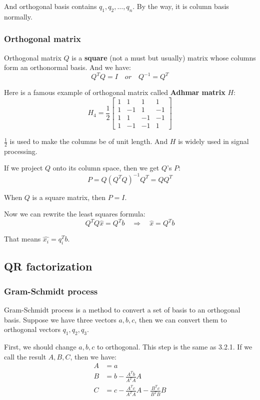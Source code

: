 \documentclass[12pt]{ctexart}
\begin{document}
And orthogonal basis contains $q_1, q_2, \ldots, q_n$. By the way, it is column basis
normally.

\subsubsection{\textbf{Orthogonal matrix}}

Orthogonal matrix $Q$ is a \textbf{square} (not a must but usually) matrix whose columns
form an orthonormal basis. And we have:
\[
  Q^{T}Q = I \quad or \quad Q^{-1} = Q^{T}
\]

Here is a famous example of orthogonal matrix called \textbf{Adhmar matrix} $H$:
\[
  H_4 = \frac12 \begin{bmatrix}
    1 & 1 & 1 & 1 \\
    1 & -1 & 1 & -1 \\
    1 & 1 & -1 & -1 \\
    1 & -1 & -1 & 1
  \end{bmatrix}
\]

$\frac12$ is used to make the columns be of unit length. And $H$ is widely used in
signal processing.

If we project $Q$ onto its column space, then we get $Q$'s $P$:
\[
  P = Q(Q^{T}Q)^{-1}Q^{T} = QQ^{T}
\]

When $Q$ is a square matrix, then $P = I$.

Now we can rewrite the least squares formula:
\[
  Q^{T}Q\hat{x} = Q^{T}b \quad \Rightarrow \quad \hat{x} = Q^{T}b
\]

That means $\hat{x_i} = $$q_i^{T}b$.

\subsection{\textbf{QR factorization}}
\subsubsection{\textbf{Gram-Schmidt process}}

Gram-Schmidt process is a method to convert a set of basis to an orthogonal basis. Suppose
we have three vectors $a, b, c$, then we can convert them to orthogonal vectors $q_1, q_2,
q_3$.

First, we should change $a, b, c$ to orthogonal. This step is the same as 3.2.1. If we
call the result $A, B, C$, then we have:
\begin{align*}
  A &= a \\
  B &= b - \frac{A^{T}b}{A^{T}A}A \\
  C &= c - \frac{A^{T}c}{A^{T}A}A - \frac{B^{T}c}{B^{T}B}B
\end{align*}
\end{document}
